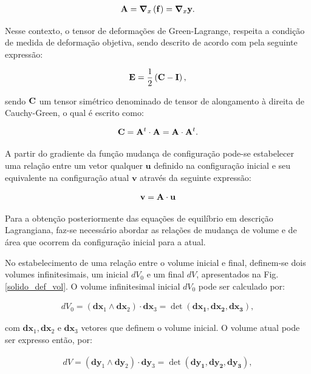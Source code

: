 \documentclass[tese_patricia]{subfiles}
\begin{document}
\begin{align}
	\mathbf{A} = \boldsymbol{\nabla}_x\left(\mathbf{f}\right) = \boldsymbol{\nabla}_x\mathbf{y}.
\end{align}

Nesse contexto, o tensor de deformações de Green-Lagrange, respeita a condição de medida de deformação objetiva, sendo descrito de acordo com  pela seguinte expressão: 

\begin{align}
\mathbf{E} = \frac{1}{2}\left(\mathbf{C} - \mathbf{I}\right),
\end{align}

\noindent sendo $\mathbf{C}$ um tensor simétrico denominado de tensor de alongamento à direita de Cauchy-Green, o qual é escrito como:

\begin{align}
\mathbf{C} = \mathbf{A}^{t} \cdot \mathbf{A} =  \mathbf{A} \cdot \mathbf{A}^{t}.
\end{align}

A partir do gradiente da função mudança de configuração pode-se estabelecer uma relação entre um vetor qualquer $\mathbf{u}$ definido na configuração inicial e seu equivalente na configuração atual $\mathbf{v}$ através da seguinte expressão:

\begin{align}
\mathbf{v} = \mathbf{A} \cdot \mathbf{u} \label{eq:rel_vet}
\end{align}

Para a obtenção posteriormente das equações de equilíbrio em descrição Lagrangiana, faz-se necessário abordar as relações de mudança de volume e de área que ocorrem da configuração inicial para a atual. 

No estabelecimento de uma relação entre o volume inicial e final, definem-se dois volumes infinitesimais, um inicial $dV_{0}$ e um final $dV$, apresentados na Fig. \ref{solido_def_vol}. O volume infinitesimal inicial $dV_{0}$ pode ser calculado por:

\begin{align}
dV_{0} = (\mathbf{dx}_{1} \wedge \mathbf{dx}_{2}) \cdot \mathbf{dx}_{3} = \det{(\mathbf{dx_1},\mathbf{dx_2},\mathbf{dx_3})},
\end{align}

\noindent com $\mathbf{dx}_1,\mathbf{dx}_2$ e $\mathbf{dx}_3$ vetores que definem o volume inicial. O volume atual pode ser expresso então, por:

\begin{align}
dV = (\mathbf{dy}_{1} \wedge \mathbf{dy}_{2}) \cdot \mathbf{dy}_{3} = \det{(\mathbf{dy_1},\mathbf{dy_2},\mathbf{dy_3})}, \label{eq:vol_atual}
\end{align}
\end{document}
